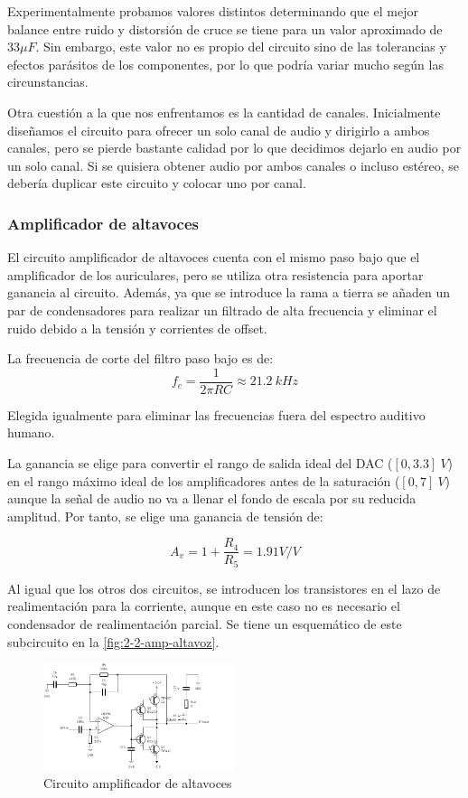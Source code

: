 Experimentalmente probamos valores distintos determinando que el mejor balance entre ruido y distorsión de cruce se tiene para un valor aproximado de $33 \mu F$. Sin embargo, este valor no es propio del circuito sino de las tolerancias y efectos parásitos de los componentes, por lo que podría variar mucho según las circunstancias.

Otra cuestión a la que nos enfrentamos es la cantidad de canales. Inicialmente diseñamos el circuito para ofrecer un solo canal de audio y dirigirlo a ambos canales, pero se pierde bastante calidad por lo que decidimos dejarlo en audio por un solo canal. Si se quisiera obtener audio por ambos canales o incluso estéreo, se debería duplicar este circuito y colocar uno por canal.

\subsubsection{Amplificador de altavoces}

El circuito amplificador de altavoces cuenta con el mismo paso bajo que el amplificador de los auriculares, pero se utiliza otra resistencia para aportar ganancia al circuito. Además, ya que se introduce la rama a tierra se añaden un par de condensadores para realizar un filtrado de alta frecuencia y eliminar el ruido debido a la tensión y corrientes de offset.

La frecuencia de corte del filtro paso bajo es de:
\[
    f_c = \frac{1}{2\pi RC} \approx 21.2\ kHz
\]

Elegida igualmente para eliminar las frecuencias fuera del espectro auditivo humano.

La ganancia se elige para convertir el rango de salida ideal del DAC ($[0, 3.3]\ V$) en el rango máximo ideal de los amplificadores antes de la saturación ($[0, 7]\ V$) aunque la señal de audio no va a llenar el fondo de escala por su reducida amplitud. Por tanto, se elige una ganancia de tensión de:

\[
    A_v = 1 + \frac{R_4}{R_5} = 1.91 V/V
\]

Al igual que los otros dos circuitos, se introducen los transistores en el lazo de realimentación para la corriente, aunque en este caso no es necesario el condensador de realimentación parcial. Se tiene un esquemático de este subcircuito en la \autoref{fig:2-2-amp-altavoz}.

\begin{figure}[h]
    \centering
    \includegraphics[width=0.5\textwidth]{images/2/2-2/circuitoAmplificadorAltavoces.png}
    \caption{Circuito amplificador de altavoces}
    \label{fig:label}
\end{figure}